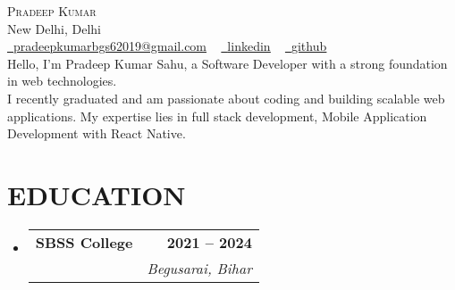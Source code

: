 \documentclass[letterpaper,11pt]{article}
\makeatletter
\newcommand{\resumeSubheading}[4]{
  \vspace{-2pt}\item
    \begin{tabular*}{1.0\textwidth}[t]{l@{\extracolsep{\fill}}r}
      \textbf{\large#1} & \textbf{\small #2} \\
      \textit{\large#3} & \textit{\small #4} \\
      
    \end{tabular*}\vspace{-7pt}
}
\newcommand{\resumeSubHeadingListStart}{\begin{itemize}[leftmargin=0.0in, label={}]}
\newcommand{\resumeSubHeadingListEnd}{\end{itemize}}
\makeatother
\begin{document}


\begin{center}
    {\Huge \scshape Pradeep Kumar} \\ \vspace{1pt}
    New Delhi, Delhi \\ \vspace{1pt}
    \small   \href{mailto:pradeepkumarbgs62019@gmail.com}{\raisebox{-0.2\height}\faEnvelope\  \underline{pradeepkumarbgs62019@gmail.com}} ~ 
    \href{https://www.linkedin.com/in/pradeep-sahu-180b3423a/}{\raisebox{-0.2\height}\faLinkedinSquare\ \underline{linkedin}}  ~
    \href{https://github.com/pradeepbgs}{\raisebox{-0.2\height}\faGithub\ \underline{github}} ~
    \vspace{-8pt} \\
    \vspace{18pt}
    Hello, I'm Pradeep Kumar Sahu, a Software Developer with a strong foundation in web technologies. \\ 
    I recently graduated and am passionate about coding and building scalable web applications. My expertise lies in full stack development, Mobile Application Development with React Native.
    \vspace{-8pt}
\end{center}



\section{EDUCATION}
  \resumeSubHeadingListStart
    \resumeSubheading
      {SBSS College  }{ 2021 --  2024}
      {  \textbf{} \textbf{}}{Begusarai, Bihar}
  \resumeSubHeadingListEnd
  

\end{document}
